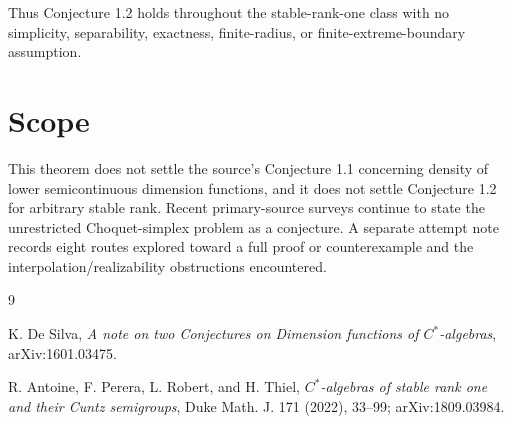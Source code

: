 \documentclass[10pt]{article}
\begin{document}
Thus Conjecture 1.2 holds throughout the stable-rank-one class with no
simplicity, separability, exactness, finite-radius, or finite-extreme-boundary
assumption.

\section*{Scope}

This theorem does not settle the source's Conjecture 1.1 concerning density of
lower semicontinuous dimension functions, and it does not settle Conjecture 1.2
for arbitrary stable rank.  Recent primary-source surveys continue to state
the unrestricted Choquet-simplex problem as a conjecture.  A separate attempt
note records eight routes explored toward a full proof or counterexample and
the interpolation/realizability obstructions encountered.

\begin{thebibliography}{9}
\raggedright
{}
K. De Silva,
\emph{A note on two Conjectures on Dimension functions of $C^*$-algebras},
arXiv:1601.03475.

R. Antoine, F. Perera, L. Robert, and H. Thiel,
\emph{$C^*$-algebras of stable rank one and their Cuntz semigroups},
Duke Math. J. 171 (2022), 33--99;
arXiv:1809.03984.
\end{thebibliography}
\end{document}

